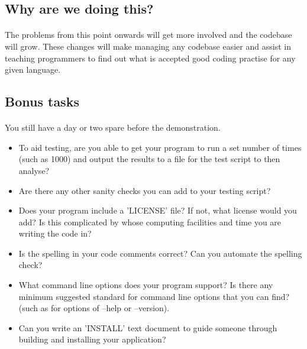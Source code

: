 \documentclass[11pt]{book}
\begin{document}
\subsection{Why are we doing this?}

\paragraph{} The problems from this point onwards will get more involved and
the codebase will grow. These changes will make managing any codebase easier
and assist in teaching programmers to find out what is accepted good coding
practise for any given language.

\subsection{Bonus tasks}

\paragraph{} You still have a day or two spare before the demonstration.

\begin{itemize}
\item To aid testing, are you able to get your program to run a set number of times (such as 1000) and output the results to a file for the test script to then analyse?
\item Are there any other sanity checks you can add to your testing script?
\item Does your program include a 'LICENSE' file? If not, what license would you add? Is this complicated by whose computing facilities and time you are writing the code in?
\item Is the spelling in your code comments correct? Can you automate the spelling check?
\item What command line options does your program support? Is there any minimum suggested standard for command line options that you can find? (such as for options of --help or --version).
\item Can you write an 'INSTALL' text document to guide someone through building and installing your application?
\end{itemize}

\clearpage
\end{document}
